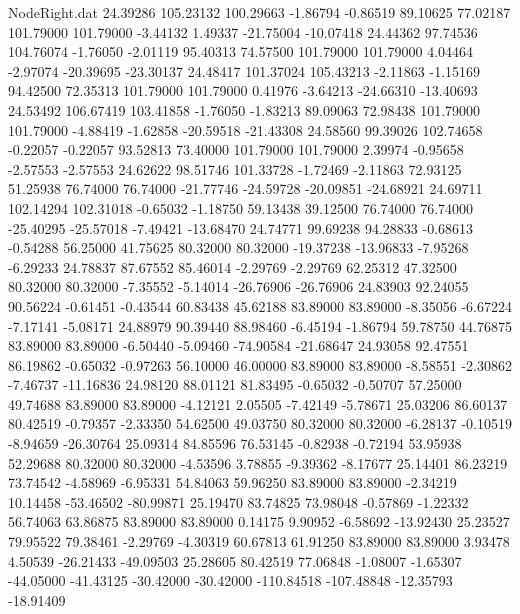 \begin{filecontents}{NodeRight.dat}
  24.39286  105.23132  100.29663    -1.86794   -0.86519   89.10625   77.02187  101.79000  101.79000   -3.44132    1.49337  -21.75004  -10.07418
  24.44362   97.74536  104.76074    -1.76050   -2.01119   95.40313   74.57500  101.79000  101.79000    4.04464   -2.97074  -20.39695  -23.30137
  24.48417  101.37024  105.43213    -2.11863   -1.15169   94.42500   72.35313  101.79000  101.79000    0.41976   -3.64213  -24.66310  -13.40693
  24.53492  106.67419  103.41858    -1.76050   -1.83213   89.09063   72.98438  101.79000  101.79000   -4.88419   -1.62858  -20.59518  -21.43308
  24.58560   99.39026  102.74658    -0.22057   -0.22057   93.52813   73.40000  101.79000  101.79000    2.39974   -0.95658   -2.57553   -2.57553
  24.62622   98.51746  101.33728    -1.72469   -2.11863   72.93125   51.25938   76.74000   76.74000  -21.77746  -24.59728  -20.09851  -24.68921
  24.69711  102.14294  102.31018    -0.65032   -1.18750   59.13438   39.12500   76.74000   76.74000  -25.40295  -25.57018   -7.49421  -13.68470
  24.74771   99.69238   94.28833    -0.68613   -0.54288   56.25000   41.75625   80.32000   80.32000  -19.37238  -13.96833   -7.95268   -6.29233
  24.78837   87.67552   85.46014    -2.29769   -2.29769   62.25312   47.32500   80.32000   80.32000   -7.35552   -5.14014  -26.76906  -26.76906
  24.83903   92.24055   90.56224    -0.61451   -0.43544   60.83438   45.62188   83.89000   83.89000   -8.35056   -6.67224   -7.17141   -5.08171
  24.88979   90.39440   88.98460    -6.45194   -1.86794   59.78750   44.76875   83.89000   83.89000   -6.50440   -5.09460  -74.90584  -21.68647
  24.93058   92.47551   86.19862    -0.65032   -0.97263   56.10000   46.00000   83.89000   83.89000   -8.58551   -2.30862   -7.46737  -11.16836
  24.98120   88.01121   81.83495    -0.65032   -0.50707   57.25000   49.74688   83.89000   83.89000   -4.12121    2.05505   -7.42149   -5.78671
  25.03206   86.60137   80.42519    -0.79357   -2.33350   54.62500   49.03750   80.32000   80.32000   -6.28137   -0.10519   -8.94659  -26.30764
  25.09314   84.85596   76.53145    -0.82938   -0.72194   53.95938   52.29688   80.32000   80.32000   -4.53596    3.78855   -9.39362   -8.17677
  25.14401   86.23219   73.74542    -4.58969   -6.95331   54.84063   59.96250   83.89000   83.89000   -2.34219   10.14458  -53.46502  -80.99871
  25.19470   83.74825   73.98048    -0.57869   -1.22332   56.74063   63.86875   83.89000   83.89000    0.14175    9.90952   -6.58692  -13.92430
  25.23527   79.95522   79.38461    -2.29769   -4.30319   60.67813   61.91250   83.89000   83.89000    3.93478    4.50539  -26.21433  -49.09503
  25.28605   80.42519   77.06848    -1.08007   -1.65307  -44.05000  -41.43125  -30.42000  -30.42000 -110.84518 -107.48848  -12.35793  -18.91409

\end{filecontents}
